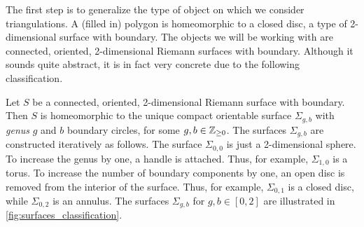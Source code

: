 \medskip
The first step is to generalize the type of object on which we consider triangulations. A (filled in) polygon is homeomorphic to a closed disc, a type of 2-dimensional surface with boundary. The objects we will be working with are connected, oriented, 2-dimensional Riemann surfaces with boundary. Although it sounds quite abstract, it is in fact very concrete due to the following classification.
\begin{theorem}\label{thm:classification_surfaces}

	Let $S$ be a connected, oriented, 2-dimensional Riemann surface with boundary. Then $S$
	is homeomorphic to the unique compact orientable surface $\Sigma_{g,b}$ with \emph{genus} $g$ and $b$ boundary circles,
	for some $g, b \in \mathbb{Z}_{\geq 0}$. The surfaces $\Sigma_{g,b}$ are constructed
	iteratively as follows. The surface $\Sigma_{0,0}$ is just a 2-dimensional sphere. To
	increase the genus by one, a handle is attached. Thus, for example, $\Sigma_{1,0}$ is a
	torus. To increase the number of boundary components by one, an open disc is removed
	from the interior of the surface. Thus, for example, $\Sigma_{0,1}$ is a closed disc,
	while $\Sigma_{0,2}$ is an annulus. The surfaces $\Sigma_{g,b}$ for $g,b \in [0,2]$ are
	illustrated in \cref{fig:surfaces_classification}.
\end{theorem}

